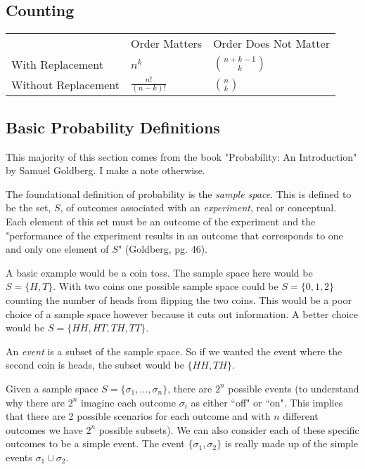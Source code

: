 \subsection{Counting}

\begin{table}\label{table:counting}
\begin{tabular}{lll}
                    & Order Matters & Order Does Not Matter \\
With Replacement    &  $n^k$             &       ${n+k-1} \choose {k}$              \\
Without Replacement &   $\frac{n!}{(n-k)!}$            &  ${n} \choose {k} $                    
\end{tabular}
\end{table}


\subsection{Basic Probability Definitions}

This majority of this section comes from the book "Probability: An Introduction" by Samuel Goldberg. I make a note otherwise.

The foundational definition of probability is the \emph{sample space}. This is defined to be the set, $S$, of outcomes associated with an \emph{experiment}, real or conceptual. Each element of this set must be an outcome of the experiment and the "performance of the experiment results in an outcome that corresponds to one and only one element of $S$" (Goldberg, pg. 46).

A basic example would be a coin toss. The sample space here would be $S = \{H,T\}$. With two coins one possible sample space could be $S=\{0,1,2\}$ counting the number of heads from flipping the two coins. This would be a poor choice of a sample space however because it cuts out information. A better choice would be $S=\{HH, HT, TH, TT\}$.

An \emph{event} is a subset of the sample space. So if we wanted the event where the second coin is heads, the subset would be $\{HH, TH\}$.

Given a sample space $S=\{\sigma_1, ..., \sigma_n\}$, there are $2^n$ possible events (to understand why there are $2^n$ imagine each outcome $\sigma_i$ as either ``off" or ``on". This implies that there are 2 possible scenarios for each outcome and with $n$ different outcomes we have $2^n$ possible subsets). We can also consider each of these specific outcomes to be a simple event. The event $\{\sigma_1, \sigma_2\}$ is really made up of the simple events ${\sigma_1} \cup {\sigma_2}$. 

